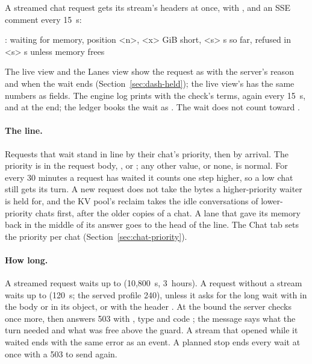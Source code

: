 A streamed chat request gets its stream's headers at once, with , and an SSE comment every 15~s:

\begin{plain}
: waiting for memory, position <n>, <x> GiB short, <s> s so far, refused in <s> s unless memory frees
\end{plain}

The live view and the Lanes view show the request as  with the server's reason and when the wait ends (Section~\ref{sec:dash-held}); the live view's  has the same numbers as fields. The engine log prints  with the check's terms, again every 15~s, and  at the end; the ledger books the wait as . The wait does not count toward .

\paragraph{The line.} Requests that wait stand in line by their chat's priority, then by arrival. The priority is  in the request body, ,  or ; any other value, or none, is normal. For every 30 minutes a request has waited it counts one step higher, so a low chat still gets its turn. A new request does not take the bytes a higher-priority waiter is held for, and the KV pool's reclaim takes the idle conversations of lower-priority chats first, after the older copies of a chat. A lane that gave its memory back in the middle of its answer goes to the head of the line. The Chat tab sets the priority per chat (Section~\ref{sec:chat-priority}).

\paragraph{How long.} A streamed request waits up to  (10,800~s, 3~hours). A request without a stream waits up to  (120~s; the served profile 240), unless it asks for the long wait with  in the body or in its  object, or with the header . At the bound the server checks once more, then answers 503 with , type  and code ; the message says what the turn needed and what was free above the guard. A stream that opened while it waited ends with the same error as an event. A planned stop ends every wait at once with a 503 to send again.

